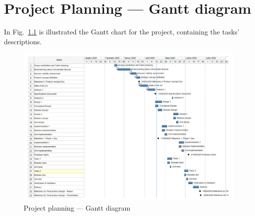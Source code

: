 \setcounter{table}{0}
\setcounter{figure}{0}
\chapter{Project Planning --- Gantt diagram}%
\label{ch:append-gantt-diag}
In Fig.~\ref{fig:gantt-diag-orig} is illustrated the Gantt chart for the
project, containing the tasks' descriptions.
% 
\begin{figure}
  \centering
  \includegraphics[page=1,width=1.0\textwidth]{sec/pdf/gantt-diag-orig.pdf} 
  \caption{Project planning --- Gantt diagram}%
  \label{fig:gantt-diag-orig}
\end{figure}
% 
